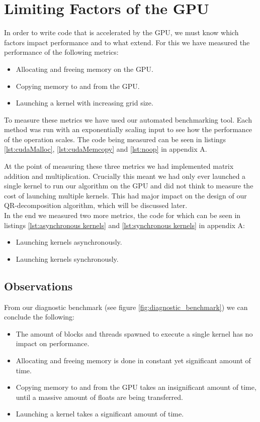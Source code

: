 \section{Limiting Factors of the GPU}

In order to write code that is accelerated by the GPU, we must know which factors impact performance and to what extend. 
For this we have measured the performance of the following metrics: 

\begin{itemize}
    \item Allocating and freeing memory on the GPU.
    \item Copying memory to and from the GPU.
    \item Launching a kernel with increasing grid size.
\end{itemize}

To measure these metrics we have used our automated benchmarking tool. Each method was run with an exponentially scaling input to see how the performance of the operation scales. The code being measured can be seen in listings \ref{lst:cudaMalloc}, \ref{lst:cudaMemcopy} and \ref{lst:noop} in appendix A.

At the point of measuring these three metrics we had implemented matrix addition and multiplication. Crucially this meant we had only ever launched a single kernel to run our algorithm on the GPU and did not think to measure the cost of launching multiple kernels. This had major impact on the design of our QR-decomposition algorithm, which will be discussed later.\\

\noindent In the end we measured two more metrics, the code for which can be seen in listings \ref{lst:asynchronous kernels} and \ref{lst:synchronous kernels} in appendix A:

\begin{itemize}
    \item Launching kernels asynchronously.
    \item Launching kernels synchronously.
\end{itemize}

\subsection{Observations}

From our diagnostic benchmark (see figure \ref{fig:diagnostic_benchmark}) we can conclude the following:

\begin{itemize}
    \item The amount of blocks and threads spawned to execute a single kernel has no impact on performance.
    \item Allocating and freeing memory is done in constant yet significant amount of time. 
    \item Copying memory to and from the GPU takes an insignificant amount of time, until a massive amount of floats are being transferred. 
    \item Launching a kernel takes a significant amount of time.  
\end{itemize} 

